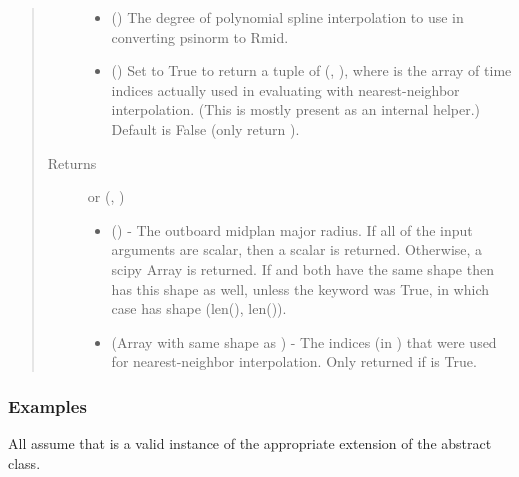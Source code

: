 \documentclass[letterpaper,10pt,english]{sphinxmanual}
\begin{document}
\begin{fulllineitems}
\begin{fulllineitems}
\begin{quote}
\begin{description}
\begin{itemize}
\item {} 
 () \textendash{} The degree of polynomial spline interpolation to
use in converting psinorm to Rmid.

\item {} 
 () \textendash{} Set to True to return a tuple of (,
), where  is the array of time indices
actually used in evaluating  with nearest-neighbor
interpolation. (This is mostly present as an internal helper.)
Default is False (only return ).

\end{itemize}

\item[{Returns}] \leavevmode

 or (, )
\begin{itemize}
\item {} 
 () - The outboard midplan major
radius. If all of the input arguments are scalar, then a scalar
is returned. Otherwise, a scipy Array is returned. If  and 
both have the same shape then  has this shape as well,
unless the  keyword was True, in which case 
has shape (len(), len()).

\item {} 
 (Array with same shape as ) - The indices
(in ) that were used for
nearest-neighbor interpolation. Only returned if  is
True.

\end{itemize}


\end{description}\end{quote}
\subsubsection*{Examples}

All assume that  is a valid instance of the appropriate
extension of the {\hyperref[\detokenize{eqtools:eqtools.core.Equilibrium}]{}} abstract class.


\end{fulllineitems}
\end{fulllineitems}
\end{document}
